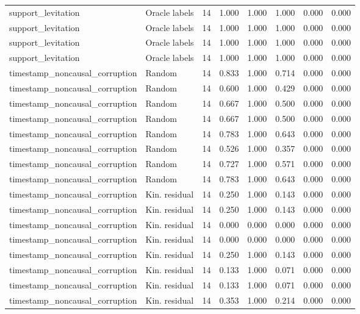 {\begin{longtable}{llrrrrrr}
support\_levitation & Oracle labels & 14 & 1.000 & 1.000 & 1.000 & 0.000 & 0.000 \\
support\_levitation & Oracle labels & 14 & 1.000 & 1.000 & 1.000 & 0.000 & 0.000 \\
support\_levitation & Oracle labels & 14 & 1.000 & 1.000 & 1.000 & 0.000 & 0.000 \\
support\_levitation & Oracle labels & 14 & 1.000 & 1.000 & 1.000 & 0.000 & 0.000 \\
timestamp\_noncausal\_corruption & Random & 14 & 0.833 & 1.000 & 0.714 & 0.000 & 0.000 \\
timestamp\_noncausal\_corruption & Random & 14 & 0.600 & 1.000 & 0.429 & 0.000 & 0.000 \\
timestamp\_noncausal\_corruption & Random & 14 & 0.667 & 1.000 & 0.500 & 0.000 & 0.000 \\
timestamp\_noncausal\_corruption & Random & 14 & 0.667 & 1.000 & 0.500 & 0.000 & 0.000 \\
timestamp\_noncausal\_corruption & Random & 14 & 0.783 & 1.000 & 0.643 & 0.000 & 0.000 \\
timestamp\_noncausal\_corruption & Random & 14 & 0.526 & 1.000 & 0.357 & 0.000 & 0.000 \\
timestamp\_noncausal\_corruption & Random & 14 & 0.727 & 1.000 & 0.571 & 0.000 & 0.000 \\
timestamp\_noncausal\_corruption & Random & 14 & 0.783 & 1.000 & 0.643 & 0.000 & 0.000 \\
timestamp\_noncausal\_corruption & Kin. residual & 14 & 0.250 & 1.000 & 0.143 & 0.000 & 0.000 \\
timestamp\_noncausal\_corruption & Kin. residual & 14 & 0.250 & 1.000 & 0.143 & 0.000 & 0.000 \\
timestamp\_noncausal\_corruption & Kin. residual & 14 & 0.000 & 0.000 & 0.000 & 0.000 & 0.000 \\
timestamp\_noncausal\_corruption & Kin. residual & 14 & 0.000 & 0.000 & 0.000 & 0.000 & 0.000 \\
timestamp\_noncausal\_corruption & Kin. residual & 14 & 0.250 & 1.000 & 0.143 & 0.000 & 0.000 \\
timestamp\_noncausal\_corruption & Kin. residual & 14 & 0.133 & 1.000 & 0.071 & 0.000 & 0.000 \\
timestamp\_noncausal\_corruption & Kin. residual & 14 & 0.133 & 1.000 & 0.071 & 0.000 & 0.000 \\
timestamp\_noncausal\_corruption & Kin. residual & 14 & 0.353 & 1.000 & 0.214 & 0.000 & 0.000 \\

\end{longtable}}
